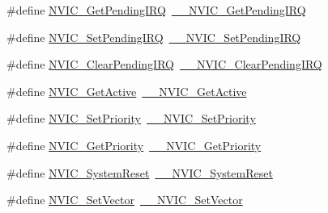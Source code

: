 \begin{DoxyCompactItemize}
\item 
\#define \hyperlink{group___c_m_s_i_s___core___n_v_i_c_functions_gac608957a239466e9e0cbc30aa64feb3b}{N\+V\+I\+C\+\_\+\+Get\+Pending\+I\+RQ}~\hyperlink{group___c_m_s_i_s___core___n_v_i_c_functions_ga5a92ca5fa801ad7adb92be7257ab9694}{\+\_\+\+\_\+\+N\+V\+I\+C\+\_\+\+Get\+Pending\+I\+RQ}
\item 
\#define \hyperlink{group___c_m_s_i_s___core___n_v_i_c_functions_ga2b47e2e52cf5c48a5c3348636434b3ac}{N\+V\+I\+C\+\_\+\+Set\+Pending\+I\+RQ}~\hyperlink{group___c_m_s_i_s___core___n_v_i_c_functions_gaabefdd4b790b9a7308929938c0c1e1ad}{\+\_\+\+\_\+\+N\+V\+I\+C\+\_\+\+Set\+Pending\+I\+RQ}
\item 
\#define \hyperlink{group___c_m_s_i_s___core___n_v_i_c_functions_ga590cf113000a079b1f0ea3dcd5b5316c}{N\+V\+I\+C\+\_\+\+Clear\+Pending\+I\+RQ}~\hyperlink{group___c_m_s_i_s___core___n_v_i_c_functions_ga562a86dbdf14827d0fee8fdafb04d191}{\+\_\+\+\_\+\+N\+V\+I\+C\+\_\+\+Clear\+Pending\+I\+RQ}
\item 
\#define \hyperlink{group___c_m_s_i_s___core___n_v_i_c_functions_ga58ad3f352f832235ab3b192ff4745320}{N\+V\+I\+C\+\_\+\+Get\+Active}~\hyperlink{group___c_m_s_i_s___core___n_v_i_c_functions_gaa2837003c28c45abf193fe5e8d27f593}{\+\_\+\+\_\+\+N\+V\+I\+C\+\_\+\+Get\+Active}
\item 
\#define \hyperlink{group___c_m_s_i_s___core___n_v_i_c_functions_gae0e9d0e2f7b6133828c71b57d4941c35}{N\+V\+I\+C\+\_\+\+Set\+Priority}~\hyperlink{group___c_m_s_i_s___core___n_v_i_c_functions_ga505338e23563a9c074910fb14e7d45fd}{\+\_\+\+\_\+\+N\+V\+I\+C\+\_\+\+Set\+Priority}
\item 
\#define \hyperlink{group___c_m_s_i_s___core___n_v_i_c_functions_gaf59b9d0a791d2157abb319753953eceb}{N\+V\+I\+C\+\_\+\+Get\+Priority}~\hyperlink{group___c_m_s_i_s___core___n_v_i_c_functions_gaeb9dc99c8e7700668813144261b0bc73}{\+\_\+\+\_\+\+N\+V\+I\+C\+\_\+\+Get\+Priority}
\item 
\#define \hyperlink{group___c_m_s_i_s___core___n_v_i_c_functions_ga6aa0367d3642575610476bf0366f0c48}{N\+V\+I\+C\+\_\+\+System\+Reset}~\hyperlink{group___c_m_s_i_s___core___n_v_i_c_functions_ga0d9aa2d30fa54b41eb780c16e35b676c}{\+\_\+\+\_\+\+N\+V\+I\+C\+\_\+\+System\+Reset}
\item 
\#define \hyperlink{group___c_m_s_i_s___core___n_v_i_c_functions_ga804af63bb4c4c317387897431814775d}{N\+V\+I\+C\+\_\+\+Set\+Vector}~\hyperlink{group___c_m_s_i_s___core___n_v_i_c_functions_ga0df355460bc1783d58f9d72ee4884208}{\+\_\+\+\_\+\+N\+V\+I\+C\+\_\+\+Set\+Vector}
\item 

\end{DoxyCompactItemize}
